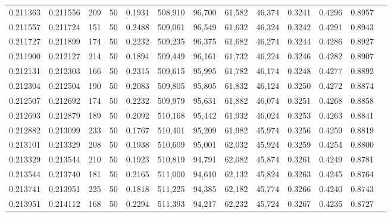 \begin{tabular}{rrrrrrrrrrrrr}
0.211363 & 0.211556 &   209 &  50 &                                     0.1931 & 508,910 &  96,700 &  61,582 &  46,374 & 0.3241 & 0.4296 & 0.8957 \\
0.211557 & 0.211724 &   151 &  50 &                                     0.2488 & 509,061 &  96,549 &  61,632 &  46,324 & 0.3242 & 0.4291 & 0.8943 \\
0.211727 & 0.211899 &   174 &  50 &                                     0.2232 & 509,235 &  96,375 &  61,682 &  46,274 & 0.3244 & 0.4286 & 0.8927 \\
0.211900 & 0.212127 &   214 &  50 &                                     0.1894 & 509,449 &  96,161 &  61,732 &  46,224 & 0.3246 & 0.4282 & 0.8907 \\
0.212131 & 0.212303 &   166 &  50 &                                     0.2315 & 509,615 &  95,995 &  61,782 &  46,174 & 0.3248 & 0.4277 & 0.8892 \\
0.212304 & 0.212504 &   190 &  50 &                                     0.2083 & 509,805 &  95,805 &  61,832 &  46,124 & 0.3250 & 0.4272 & 0.8874 \\
0.212507 & 0.212692 &   174 &  50 &                                     0.2232 & 509,979 &  95,631 &  61,882 &  46,074 & 0.3251 & 0.4268 & 0.8858 \\
0.212693 & 0.212879 &   189 &  50 &                                     0.2092 & 510,168 &  95,442 &  61,932 &  46,024 & 0.3253 & 0.4263 & 0.8841 \\
0.212882 & 0.213099 &   233 &  50 &                                     0.1767 & 510,401 &  95,209 &  61,982 &  45,974 & 0.3256 & 0.4259 & 0.8819 \\
0.213101 & 0.213329 &   208 &  50 &                                     0.1938 & 510,609 &  95,001 &  62,032 &  45,924 & 0.3259 & 0.4254 & 0.8800 \\
0.213329 & 0.213544 &   210 &  50 &                                     0.1923 & 510,819 &  94,791 &  62,082 &  45,874 & 0.3261 & 0.4249 & 0.8781 \\
0.213544 & 0.213740 &   181 &  50 &                                     0.2165 & 511,000 &  94,610 &  62,132 &  45,824 & 0.3263 & 0.4245 & 0.8764 \\
0.213741 & 0.213951 &   225 &  50 &                                     0.1818 & 511,225 &  94,385 &  62,182 &  45,774 & 0.3266 & 0.4240 & 0.8743 \\
0.213951 & 0.214112 &   168 &  50 &                                     0.2294 & 511,393 &  94,217 &  62,232 &  45,724 & 0.3267 & 0.4235 & 0.8727 \\

\end{tabular}

